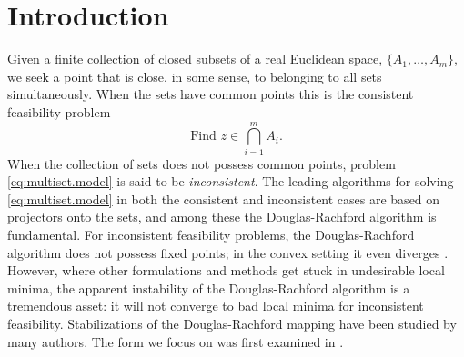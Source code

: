 \documentclass[12pt]{article}
\theoremstyle{definition}
\begin{document}
\section{Introduction}
Given a finite collection of closed subsets of a real Euclidean space, $\{A_1,\dots,A_m\}$, we seek
a point that is close, in some sense, to belonging to all sets simultaneously.  When the sets
have common points this is the consistent feasibility problem
\begin{equation}\label{eq:multiset.model}
    \mbox{Find } z\in \bigcap_{i=1}^m A_i.
\end{equation}
When the collection of sets does not possess common points, problem \eqref{eq:multiset.model} is
said to be {\em inconsistent}.
The leading algorithms for solving \eqref{eq:multiset.model} in both the consistent and
inconsistent cases are based on projectors onto the sets, and among these the Douglas-Rachford
algorithm is fundamental.  For inconsistent feasibility problems, the Douglas-Rachford algorithm
does not possess fixed points;  in the convex setting it even diverges \cite{LionsMercier79}.
However, where other formulations and methods get stuck in undesirable local minima, the apparent instability
of the Douglas-Rachford algorithm is a tremendous asset: it will not converge to bad local minima
for inconsistent feasibility.  Stabilizations of the Douglas-Rachford mapping have been studied
by many authors.  The form we focus on was first examined in \cite{Luke2005}.
\end{document}

